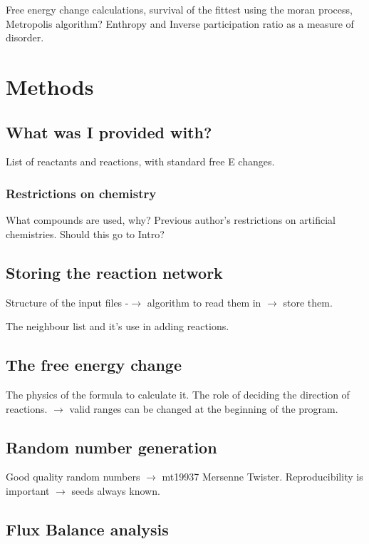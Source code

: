 \documentclass[]{article}
\begin{document}
Free energy change calculations, survival of the fittest using the moran process, Metropolis algorithm? Enthropy and Inverse participation ratio as a measure of disorder. 


\section{Methods}
\label{sec:methods}

\subsection{What was I provided with?}
\label{sub:What was I provided with?}
List of reactants and reactions, with standard free E changes. 
\subsubsection{Restrictions on chemistry}
\label{ssub:Restrictions on chemistry}
What compounds are used, why?
Previous author's restrictions on artificial chemistries. Should this go to Intro?
\subsection{Storing the reaction network}
\label{sub:Storing the reaction network}
Structure of the input files -$\rightarrow$ algorithm to read them in $\rightarrow$ store them. 

The neighbour list and it's use in adding reactions.
\subsection{The free energy change}
\label{sub:The free energy change}
The physics of the formula to calculate it. The role of deciding the direction of reactions.  $\rightarrow$ valid ranges can be changed at the beginning of the program.

\subsection{Random number generation}
\label{sub:Random number generation}

Good quality random numbers $\rightarrow$ mt19937 Mersenne Twister. Reproducibility is important $\rightarrow$ seeds always known. 



\subsection{Flux Balance analysis}
\label{sub:Flux Balance analysis}
\end{document}
